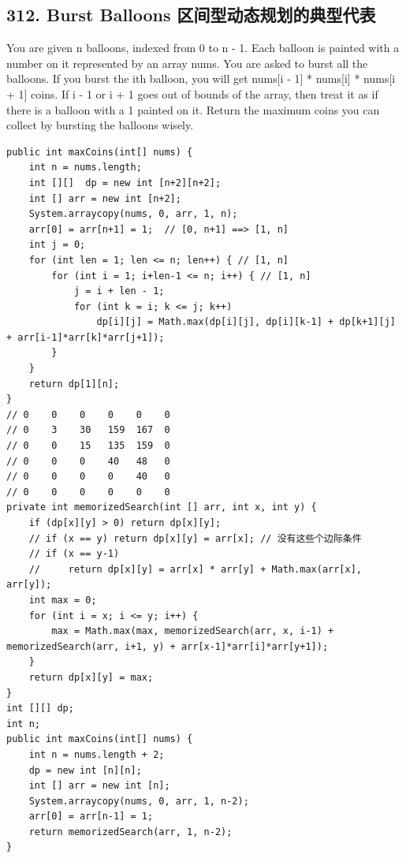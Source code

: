 \documentclass[9pt, b5paper]{article}
\begin{document}
\subsection{312. Burst Balloons 区间型动态规划的典型代表}
\label{sec-4-18}
You are given n balloons, indexed from 0 to n - 1. Each balloon is painted with a number on it represented by an array nums. You are asked to burst all the balloons.
If you burst the ith balloon, you will get nums[i - 1] * nums[i] * nums[i + 1] coins. If i - 1 or i + 1 goes out of bounds of the array, then treat it as if there is a balloon with a 1 painted on it.
Return the maximum coins you can collect by bursting the balloons wisely.
\begin{verbatim}
public int maxCoins(int[] nums) {
    int n = nums.length;
    int [][]  dp = new int [n+2][n+2];
    int [] arr = new int [n+2];
    System.arraycopy(nums, 0, arr, 1, n);
    arr[0] = arr[n+1] = 1;  // [0, n+1] ==> [1, n]
    int j = 0;
    for (int len = 1; len <= n; len++) { // [1, n]
        for (int i = 1; i+len-1 <= n; i++) { // [1, n]
            j = i + len - 1;
            for (int k = i; k <= j; k++) 
                dp[i][j] = Math.max(dp[i][j], dp[i][k-1] + dp[k+1][j] + arr[i-1]*arr[k]*arr[j+1]);
        }
    }
    return dp[1][n];
}
// 0    0    0    0    0    0
// 0    3    30   159  167  0
// 0    0    15   135  159  0
// 0    0    0    40   48   0
// 0    0    0    0    40   0
// 0    0    0    0    0    0
private int memorizedSearch(int [] arr, int x, int y) {
    if (dp[x][y] > 0) return dp[x][y];
    // if (x == y) return dp[x][y] = arr[x]; // 没有这些个边际条件
    // if (x == y-1) 
    //     return dp[x][y] = arr[x] * arr[y] + Math.max(arr[x], arr[y]);
    int max = 0;
    for (int i = x; i <= y; i++) {
        max = Math.max(max, memorizedSearch(arr, x, i-1) + memorizedSearch(arr, i+1, y) + arr[x-1]*arr[i]*arr[y+1]);
    }
    return dp[x][y] = max;
}
int [][] dp;
int n;
public int maxCoins(int[] nums) {
    int n = nums.length + 2;
    dp = new int [n][n];
    int [] arr = new int [n];
    System.arraycopy(nums, 0, arr, 1, n-2);
    arr[0] = arr[n-1] = 1;
    return memorizedSearch(arr, 1, n-2);
}
\end{verbatim}
\end{document}
